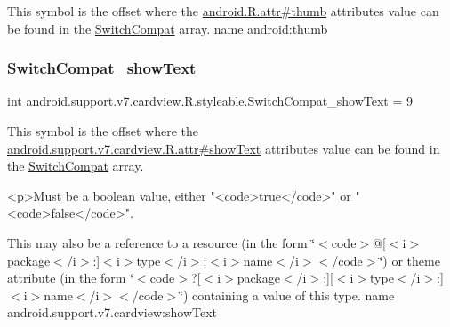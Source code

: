 This symbol is the offset where the \hyperlink{}{android.\+R.\+attr\#thumb} attribute\textquotesingle{}s value can be found in the \hyperlink{classandroid_1_1support_1_1v7_1_1cardview_1_1R_1_1styleable_a8b1fbe9bb91473a7977ff98951ed5255}{Switch\+Compat} array.  name android\+:thumb \mbox{\label{classandroid_1_1support_1_1v7_1_1cardview_1_1R_1_1styleable_ad2a7ec0499f9c6b3a7bfda457a82be97}} 
\subsubsection{\texorpdfstring{Switch\+Compat\+\_\+show\+Text}{SwitchCompat\_showText}}
{\footnotesize\ttfamily int android.\+support.\+v7.\+cardview.\+R.\+styleable.\+Switch\+Compat\+\_\+show\+Text = 9\hspace{0.3cm}{\ttfamily [static]}}

This symbol is the offset where the \hyperlink{classandroid_1_1support_1_1v7_1_1cardview_1_1R_1_1attr_a6d1cb415e3b1eef3bcb5ec2ac578c03a}{android.\+support.\+v7.\+cardview.\+R.\+attr\#show\+Text} attribute\textquotesingle{}s value can be found in the \hyperlink{classandroid_1_1support_1_1v7_1_1cardview_1_1R_1_1styleable_a8b1fbe9bb91473a7977ff98951ed5255}{Switch\+Compat} array.

\begin{DoxyVerb}      <p>Must be a boolean value, either "<code>true</code>" or "<code>false</code>".
\end{DoxyVerb}
 

This may also be a reference to a resource (in the form \char`\"{}$<$code$>$@\mbox{[}$<$i$>$package$<$/i$>$\+:\mbox{]}$<$i$>$type$<$/i$>$\+:$<$i$>$name$<$/i$>$$<$/code$>$\char`\"{}) or theme attribute (in the form \char`\"{}$<$code$>$?\mbox{[}$<$i$>$package$<$/i$>$\+:\mbox{]}\mbox{[}$<$i$>$type$<$/i$>$\+:\mbox{]}$<$i$>$name$<$/i$>$$<$/code$>$\char`\"{}) containing a value of this type.  name android.\+support.\+v7.\+cardview\+:show\+Text \mbox{\label{classandroid_1_1support_1_1v7_1_1cardview_1_1R_1_1styleable_adb2fe94b52e4196f86533c6c9620503e}} 
